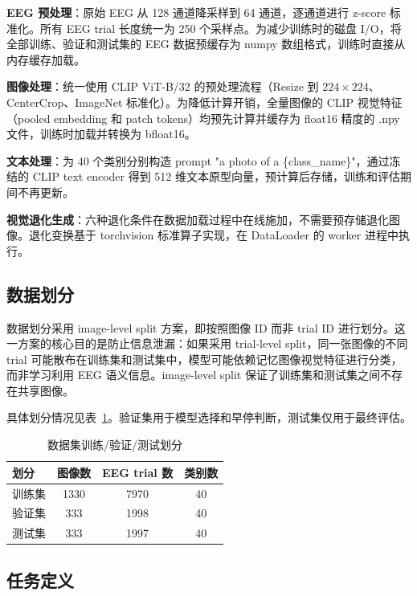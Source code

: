 \textbf{EEG 预处理}：原始 EEG 从 128 通道降采样到 64 通道，逐通道进行 z-score 标准化。所有 EEG trial 长度统一为 250 个采样点。为减少训练时的磁盘 I/O，将全部训练、验证和测试集的 EEG 数据预缓存为 numpy 数组格式，训练时直接从内存缓存加载。

\textbf{图像处理}：统一使用 CLIP ViT-B/32 的预处理流程（Resize 到 $224\times224$、CenterCrop、ImageNet 标准化）。为降低计算开销，全量图像的 CLIP 视觉特征（pooled embedding 和 patch tokens）均预先计算并缓存为 float16 精度的 .npy 文件，训练时加载并转换为 bfloat16。

\textbf{文本处理}：为 40 个类别分别构造 prompt "a photo of a \{class\_name\}"，通过冻结的 CLIP text encoder 得到 512 维文本原型向量，预计算后存储，训练和评估期间不再更新。

\textbf{视觉退化生成}：六种退化条件在数据加载过程中在线施加，不需要预存储退化图像。退化变换基于 torchvision 标准算子实现，在 DataLoader 的 worker 进程中执行。

\subsection{数据划分}

数据划分采用 image-level split 方案，即按照图像 ID 而非 trial ID 进行划分。这一方案的核心目的是防止信息泄漏：如果采用 trial-level split，同一张图像的不同 trial 可能散布在训练集和测试集中，模型可能依赖记忆图像视觉特征进行分类，而非学习利用 EEG 语义信息。image-level split 保证了训练集和测试集之间不存在共享图像。

具体划分情况见表~\ref{tab:split}。验证集用于模型选择和早停判断，测试集仅用于最终评估。

\begin{table}[htbp]
  \centering
  \caption{数据集训练/验证/测试划分}
  \label{tab:split}
  \begin{tabular}{l c c c}
    \toprule
    划分 & 图像数 & EEG trial 数 & 类别数 \\
    \midrule
    训练集 & 1330 & 7970 & 40 \\
    验证集 & 333 & 1998 & 40 \\
    测试集 & 333 & 1997 & 40 \\
    \bottomrule
  \end{tabular}
\end{table}

\subsection{任务定义}

